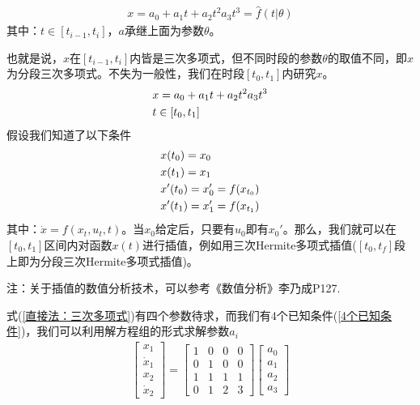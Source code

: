             \begin{align*}
            x = a_0+a_1t+a_2t^2a_3t^3 = \hat{f}(t|\theta)
            \end{align*}
            其中：$t \in [t_{i-1},t_i]$，$a$承继上面为参数$\theta$。
            \par
            也就是说，$x$在$[t_{i-1},t_i]$内皆是三次多项式，但不同时段的参数$\theta$的取值不同，即$x$为分段三次多项式。不失为一般性，我们在时段$[t_0,t_1]$内研究$x$。
            \begin{align}
            \label{直接法：三次多项式}
            & x = a_0+a_1t+a_2t^2a_3t^3 \\
            & t\in [t_0,t_1]\notag
            \end{align}
            假设我们知道了以下条件
            \begin{align}
            \label{4个已知条件}
            & x(t_0) = x_0\notag\\
            & x(t_1) = x_1\notag\\
            & x'(t_0) = x_0' = f(x_{t_0})\notag\\
            & x'(t_1) = x_1' = f(x_{t_1})
            \end{align}
            其中：$\dot{x} = f(x_t,u_t,t)$。当$x_0$给定后，只要有$u_0$即有$x_0'$。那么，我们就可以在$[t_0,t_1]$区间内对函数$x(t)$进行插值，例如用三次Hermite多项式插值($[t_0,t_f]$段上即为分段三次Hermite多项式插值)。
            \par
            注：关于插值的数值分析技术，可以参考《数值分析》李乃成P127.
            \par
            式(\ref{直接法：三次多项式})有四个参数待求，而我们有4个已知条件(\ref{4个已知条件})，我们可以利用解方程组的形式求解参数$a_i$
            \begin{align*}
            \begin{bmatrix}
            x_1\\
            \dot{x}_1\\
            x_2\\
            \dot{x}_2
            \end{bmatrix}
            =
            \begin{bmatrix}
            1 & 0 & 0 & 0 \\
            0 & 1 & 0 & 0 \\
            1 & 1 & 1 & 1 \\
            0 & 1 & 2 & 3
            \end{bmatrix}
            \begin{bmatrix}
            a_0\\
            a_1\\
            a_2\\
            a_3
            \end{bmatrix}
            \end{align*}
